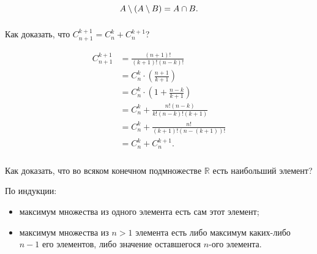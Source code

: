 \documentclass[11pt, a5paper]{article}
\newenvironment{note}[1]{\subsubsection{}}{}
\newenvironment{cloze}[2][\ldots]{\begin{leftbar}}{\end{leftbar}}
\newenvironment{icloze}[2][\ldots]{\ignorespaces}{\unskip}
\begin{document}
    \begin{note}{e12a9ee541074f3f83c0236b906973d1}
        \[
            A \setminus (A \setminus B) = \begin{icloze}{1}A \cap B.\end{icloze}
        \]
    \end{note}

    \begin{note}{59b526f72a4343fb936d1fa20561c886}
        Как доказать, что \; \( C_{n + 1}^{k + 1} = C_n^k + C_n^{k + 1} \)?
        \begin{cloze}{1}
            \begin{align*}
                C_{n + 1}^{k + 1} &= \frac{(n + 1)!}{(k + 1)!(n - k)!} \\
                &= C_n^k \cdot \left( \frac{n + 1}{k + 1}  \right) \\
                &= C_n^k \cdot \left( 1 + \frac{n - k}{k + 1}  \right) \\
                &= C_n^k + \frac{n! (n - k)}{k!(n - k)!(k + 1)} \\
                &= C_n^k + \frac{n!}{(k + 1)!(n - (k + 1))!} \\
                &= C_n^k + C_n^{k + 1}.
            \end{align*}
        \end{cloze}
    \end{note}

    \begin{note}{a20a03ca2ebe4b5d85249845f15f1561}
        Как доказать, что во всяком конечном подмножестве \(\mathbb{R}\) есть
        наибольший элемент?

        \begin{cloze}{1}
            По индукции:
            \begin{itemize}
                \item максимум множества из одного элемента есть сам этот
                    элемент;
                \item максимум множества из \( n > 1 \) элемента есть либо
                    максимум каких-либо \( n - 1 \) его элементов, либо значение
                    оставшегося \( n \)-ого элемента.
            \end{itemize}
        \end{cloze}
    \end{note}
\end{document}

